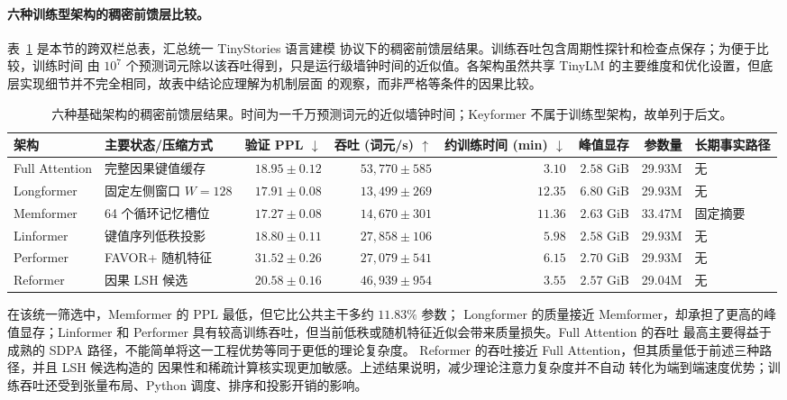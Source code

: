 \documentclass[letterpaper]{article}
\begin{document}
\paragraph{六种训练型架构的稠密前馈层比较。}
表~\ref{tab:six-dense-comparison} 是本节的跨双栏总表，汇总统一 TinyStories 语言建模
协议下的稠密前馈层结果。训练吞吐包含周期性探针和检查点保存；为便于比较，训练时间
由 $10^7$ 个预测词元除以该吞吐得到，只是运行级墙钟时间的近似值。各架构虽然共享
TinyLM 的主要维度和优化设置，但底层实现细节并不完全相同，故表中结论应理解为机制层面
的观察，而非严格等条件的因果比较。

\begin{table}[t]
\centering
\scriptsize
\caption{六种基础架构的稠密前馈层结果。时间为一千万预测词元的近似墙钟时间；Keyformer 不属于训练型架构，故单列于后文。}
\label{tab:six-dense-comparison}
\begin{tabular}{l l r r r r r l}
\toprule
架构 & 主要状态/压缩方式 & 验证 PPL $\downarrow$ & 吞吐 (词元/s) $\uparrow$ & 约训练时间 (min) $\downarrow$ & 峰值显存 & 参数量 & 长期事实路径 \\
\midrule
Full Attention & 完整因果键值缓存 & $18.95\pm0.12$ & $53{,}770\pm585$ & $3.10$ & $2.58$ GiB & 29.93M & 无 \\
Longformer & 固定左侧窗口 $W=128$ & $17.91\pm0.08$ & $13{,}499\pm269$ & $12.35$ & $6.80$ GiB & 29.93M & 无 \\
Memformer & 64 个循环记忆槽位 & $17.27\pm0.08$ & $14{,}670\pm301$ & $11.36$ & $2.63$ GiB & 33.47M & 固定摘要 \\
Linformer & 键值序列低秩投影 & $18.80\pm0.11$ & $27{,}858\pm106$ & $5.98$ & $2.58$ GiB & 29.93M & 无 \\
Performer & FAVOR+ 随机特征 & $31.52\pm0.26$ & $27{,}079\pm541$ & $6.15$ & $2.70$ GiB & 29.93M & 无 \\
Reformer & 因果 LSH 候选 & $20.58\pm0.16$ & $46{,}939\pm954$ & $3.55$ & $2.57$ GiB & 29.04M & 无 \\
\bottomrule
\end{tabular}
\end{table}

在该统一筛选中，Memformer 的 PPL 最低，但它比公共主干多约 $11.83\%$ 参数；
Longformer 的质量接近 Memformer，却承担了更高的峰值显存；Linformer 和 Performer
具有较高训练吞吐，但当前低秩或随机特征近似会带来质量损失。Full Attention 的吞吐
最高主要得益于成熟的 SDPA 路径，不能简单将这一工程优势等同于更低的理论复杂度。
Reformer 的吞吐接近 Full Attention，但其质量低于前述三种路径，并且 LSH 候选构造的
因果性和稀疏计算核实现更加敏感。上述结果说明，减少理论注意力复杂度并不自动
转化为端到端速度优势；训练吞吐还受到张量布局、Python 调度、排序和投影开销的影响。
\end{document}
